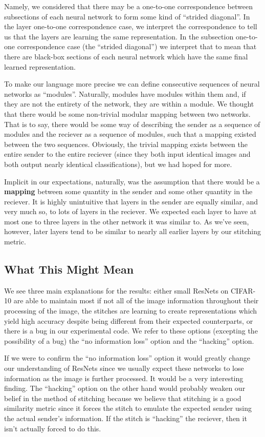\documentclass{article} %
\begin{document}
Namely, we considered that there may be a one-to-one correspondence between subsections of each neural network to
form some kind of ``strided diagonal''. In the layer one-to-one correspondence case, we interpret the correspondence
to tell us that the layers are learning the same representation. In the subsection one-to-one correspondence case
(the ``strided diagonal'') we interpret that to mean that there are black-box sections of each neural network which
have the same final learned representation.

To make our language more precise we can define consecutive sequences of neural networks as ``modules''. Naturally,
modules have modules within them and, if they are not the entirety of the network, they are within a module. We thought
that there would be some non-trivial modular mapping between two networks. That is to say, there would be some way of
describing the sender as a sequence of modules and the reciever as a sequence of modules, such that a mapping existed
between the two sequences. Obviously, the trivial mapping exists between the entire sender to the entire reciever
(since they both input identical images and both output nearly identical classifications), but we had hoped for more.

Implicit in our expectations, naturally, was the assumption that there would be a \textbf{mapping} between some quantity
in the sender and some other quantity in the reciever. It is highly unintuitive that layers in the sender are equally
similar, and very much so, to lots of layers in the reciever. We expected each layer to have at most one to three layers
in the other network it was similar to. As we've seen, however, later layers tend to be similar to nearly all earlier layers
by our stitching metric.

\subsection*{What This Might Mean}
We see three main explanations for the results: either small ResNets on CIFAR-10 are able to maintain most if not all of the image
information throughout their processing of the image, the stitches are learning to create representations which yield high
accuracy despite being different from their expected counterparts, or there is a bug in our experimental code. We refer to these
options (excepting the possibility of a bug) the ``no information loss'' option and the ``hacking'' option.

If we were to confirm the ``no information loss'' option it would greatly change our understanding of ResNets
since we usually expect these networks to lose information as the image is further processed. It would be a
very interesting finding. The ``hacking'' option on the other hand would probably weaken our belief in the method
of stitching because we believe that stitching is a good similarity metric since it forces the stitch to emulate
the expected sender using the actual sender's information. If the stitch is ``hacking'' the reciever, then it
isn't actually forced to do this.
\end{document}
